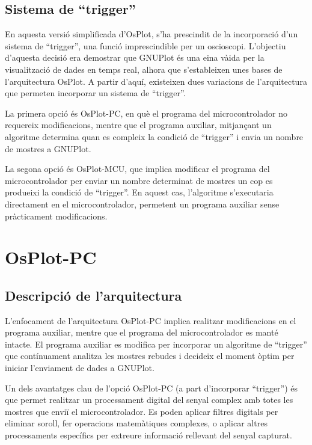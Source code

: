 \documentclass{tfgitic}[2023/06/30]
\begin{document}
\subsection{Sistema de ``trigger''}

En aquesta versió simplificada d'OsPlot, s'ha prescindit de la
incorporació d'un sistema de ``trigger'', una funció imprescindible
per un osci\lgem oscopi. L'objectiu d'aquesta decisió era demostrar
que GNUPlot és una eina và\lgem ida per la visualització de dades en
temps real, alhora que s'estableixen unes bases de l'arquitectura
OsPlot. A partir d'aquí, existeixen dues variacions de l'arquitectura
que permeten incorporar un sistema de ``trigger''.

La primera opció és OsPlot-PC, en què el programa del microcontrolador
no requereix modificacions, mentre que el programa auxiliar,
mitjançant un algoritme determina quan es compleix la condició de
``trigger'' i envia un nombre de mostres a GNUPlot.

La segona opció és OsPlot-MCU, que implica modificar el programa del
microcontrolador per enviar un nombre determinat de mostres un cop es
produeixi la condició de ``trigger''. En aquest cas, l'algoritme
s'executaria directament en el microcontrolador, permetent un programa
auxiliar sense pràcticament modificacions.

\newpage

\section{OsPlot-PC}

\subsection{Descripció de l'arquitectura}

L'enfocament de l'arquitectura OsPlot-PC implica realitzar
modificacions en el programa auxiliar, mentre que el programa del
microcontrolador es manté intacte. El programa auxiliar es modifica
per incorporar un algoritme de ``trigger'' que contínuament analitza
les mostres rebudes i decideix el moment òptim per iniciar l'enviament
de dades a GNUPlot.

Un dels avantatges clau de l'opció OsPlot-PC (a part d'incorporar
``trigger'') és que permet realitzar un processament digital del
senyal complex amb totes les mostres que enviï el microcontrolador. Es
poden aplicar filtres digitals per eliminar soroll, fer operacions
matemàtiques complexes, o aplicar altres processaments específics per
extreure informació rellevant del senyal capturat.
\end{document}
